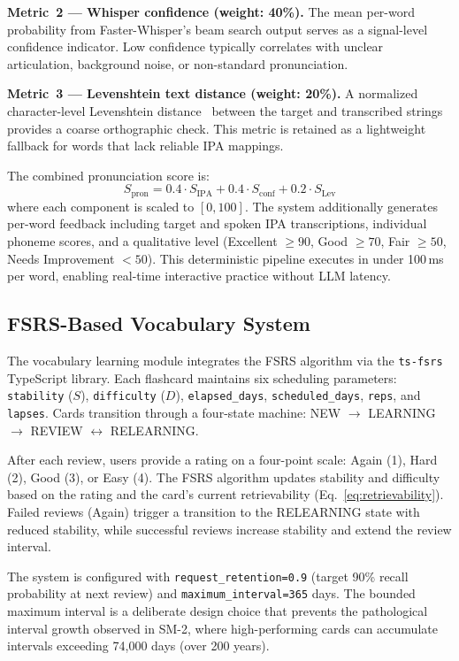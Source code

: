 \documentclass[conference]{IEEEtran}
\begin{document}
\textbf{Metric~2 --- Whisper confidence (weight: 40\%).} The mean per-word probability from Faster-Whisper's beam search output serves as a signal-level confidence indicator. Low confidence typically correlates with unclear articulation, background noise, or non-standard pronunciation.

\textbf{Metric~3 --- Levenshtein text distance (weight: 20\%).} A normalized character-level Levenshtein distance~\cite{levenshtein} between the target and transcribed strings provides a coarse orthographic check. This metric is retained as a lightweight fallback for words that lack reliable IPA mappings.

The combined pronunciation score is:
\begin{equation}
S_{\text{pron}} = 0.4 \cdot S_{\text{IPA}} + 0.4 \cdot S_{\text{conf}} + 0.2 \cdot S_{\text{Lev}}
\label{eq:pron_combined}
\end{equation}
where each component is scaled to $[0, 100]$. The system additionally generates per-word feedback including target and spoken IPA transcriptions, individual phoneme scores, and a qualitative level (Excellent $\geq 90$, Good $\geq 70$, Fair $\geq 50$, Needs Improvement $< 50$). This deterministic pipeline executes in under 100\,ms per word, enabling real-time interactive practice without LLM latency.

\subsection{FSRS-Based Vocabulary System}

The vocabulary learning module integrates the FSRS algorithm via the \texttt{ts-fsrs} TypeScript library. Each flashcard maintains six scheduling parameters: \texttt{stability} ($S$), \texttt{difficulty} ($D$), \texttt{elapsed\_days}, \texttt{scheduled\_days}, \texttt{reps}, and \texttt{lapses}. Cards transition through a four-state machine: NEW $\rightarrow$ LEARNING $\rightarrow$ REVIEW $\leftrightarrow$ RELEARNING.

After each review, users provide a rating on a four-point scale: Again (1), Hard (2), Good (3), or Easy (4). The FSRS algorithm updates stability and difficulty based on the rating and the card's current retrievability (Eq.~\ref{eq:retrievability}). Failed reviews (Again) trigger a transition to the RELEARNING state with reduced stability, while successful reviews increase stability and extend the review interval.

The system is configured with \texttt{request\_retention=0.9} (target 90\% recall probability at next review) and \texttt{maximum\_interval=365} days. The bounded maximum interval is a deliberate design choice that prevents the pathological interval growth observed in SM-2, where high-performing cards can accumulate intervals exceeding 74{,}000 days (over 200 years).
\end{document}
